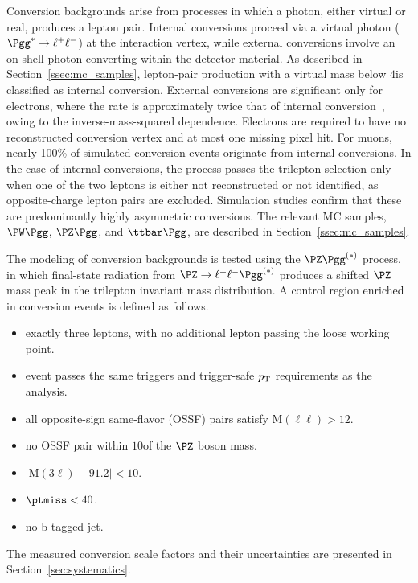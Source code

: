 Conversion backgrounds arise from processes in which a photon, either virtual or real, produces a lepton pair. Internal conversions proceed via a virtual photon ($\Pgg^{*} \to \ell^{+}\ell^{-}$) at the interaction vertex, while external conversions involve an on-shell photon converting within the detector material. As described in Section~\ref{ssec:mc_samples}, lepton-pair production with a virtual mass below $4$\GeV is classified as internal conversion. External conversions are significant only for electrons, where the rate is approximately twice that of internal conversion~\cite{ExtConv}, owing to the inverse-mass-squared dependence. Electrons are required to have no reconstructed conversion vertex and at most one missing pixel hit. For muons, nearly 100\% of simulated conversion events originate from internal conversions. In the case of internal conversions, the process passes the trilepton selection only when one of the two leptons is either not reconstructed or not identified, as opposite-charge lepton pairs are excluded. Simulation studies confirm that these are predominantly highly asymmetric conversions. The relevant MC samples, $\PW\Pgg$, $\PZ\Pgg$, and $\ttbar\Pgg$, are described in Section~\ref{ssec:mc_samples}.

The modeling of conversion backgrounds is tested using the $\PZ\Pgg^{(*)}$ process, in which final-state radiation from $\PZ \to \ell^{+}\ell^{-}\Pgg^{(*)}$ produces a shifted $\PZ$ mass peak in the trilepton invariant mass distribution. A control region enriched in conversion events is defined as follows.
\begin{itemize}
  \item exactly three leptons, with no additional lepton passing the loose working point.
  \item event passes the same triggers and trigger-safe $p_{\mathrm{T}}$ requirements as the analysis.
  \item all opposite-sign same-flavor (OSSF) pairs satisfy $\mathrm{M}(\ell\ell) > 12$\GeV.
  \item no OSSF pair within $10$\GeV of the $\PZ$ boson mass.
  \item $|\mathrm{M}(3\ell) - 91.2| < 10$\GeV.
  \item $\ptmiss < 40$\GeV.
  \item no b-tagged jet.
\end{itemize}
The measured conversion scale factors and their uncertainties are presented in Section~\ref{sec:systematics}.

